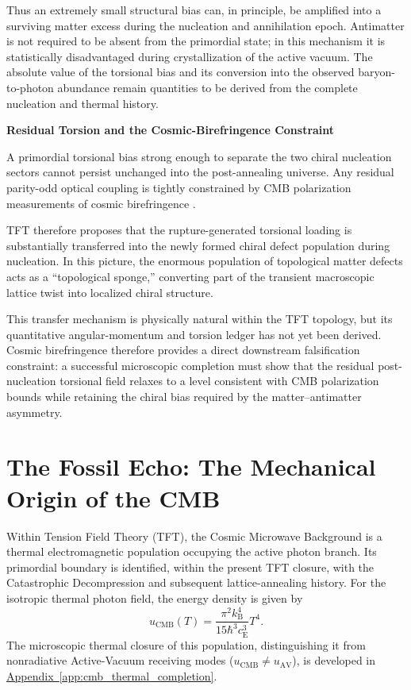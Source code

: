 Thus an extremely small structural bias can, in principle, be amplified into a surviving matter excess during the nucleation and annihilation epoch. Antimatter is not required to be absent from the primordial state; in this mechanism it is statistically disadvantaged during crystallization of the active vacuum. The absolute value of the torsional bias and its conversion into the observed baryon-to-photon abundance remain quantities to be derived from the complete nucleation and thermal history.

\vspace{0.5em}

\noindent\textbf{Residual Torsion and the Cosmic-Birefringence Constraint}
\label{sec:resolution_cosmic_birefringence}

A primordial torsional bias strong enough to separate the two chiral nucleation sectors cannot persist unchanged into the post-annealing universe. Any residual parity-odd optical coupling is tightly constrained by CMB polarization measurements of cosmic birefringence \cite{Minami_2020}.

TFT therefore proposes that the rupture-generated torsional loading is substantially transferred into the newly formed chiral defect population during nucleation. In this picture, the enormous population of topological matter defects acts as a ``topological sponge,'' converting part of the transient macroscopic lattice twist into localized chiral structure.

This transfer mechanism is physically natural within the TFT topology, but its quantitative angular-momentum and torsion ledger has not yet been derived. Cosmic birefringence therefore provides a direct downstream falsification constraint: a successful microscopic completion must show that the residual post-nucleation torsional field relaxes to a level consistent with CMB polarization bounds while retaining the chiral bias required by the matter--antimatter asymmetry.

\section{The Fossil Echo: The Mechanical Origin of the CMB}
\label{sec:phonon_echo_cmb}

Within Tension Field Theory (TFT), the Cosmic Microwave Background is a thermal electromagnetic population occupying the active photon branch. Its primordial boundary is identified, within the present TFT closure, with the Catastrophic Decompression and subsequent lattice-annealing history. For the isotropic thermal photon field, the energy density is given by
\begin{equation}
    u_{\mathrm{CMB}}(T) = \frac{\pi^2 k_{\mathrm B}^4}{15\hbar^3 c_{\mathrm E}^3} T^4.
\end{equation}
The microscopic thermal closure of this population, distinguishing it from nonradiative Active-Vacuum receiving modes ($u_{\mathrm{CMB}} \neq u_{\mathrm{AV}}$), is developed in \hyperref[app:cmb_thermal_completion]{Appendix~\ref*{app:cmb_thermal_completion}}.

